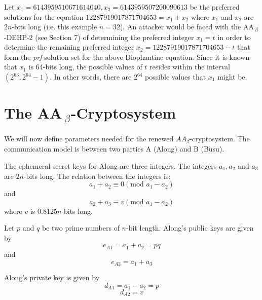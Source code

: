 \documentclass{llncs}
\begin{document}
\begin{example}
Let $x_{1}=6143959510671614040, x_{2}=6143959507200090613$ be the
preferred solutions for the equation
$12287919017871704653=x_{1}+x_{2}$ where $x_1$ and $x_{2}$ are
$2n$-bits long (i.e. this example $n=32$). An attacker would be
faced with the AA\,$_{\beta}$-DEHP-2 (see Section 7) of
determining the preferred integer $x_{1}=t$ in order to determine
the remaining preferred integer $x_{2}=12287919017871704653-t$
that form the \textit{prf}-solution set for the above Diophantine
equation. Since it is known that $x_{1}$ is 64-bits long, the
possible values of $t$ resides within the interval $(2^{63},
2^{64}-1)$. In other words, there are $2^{64}$ possible values
that $x_{1}$ might be.
\end{example}

\section{The AA\,$_{\beta}$-Cryptosystem}
\noindent We will now define parameters needed for the renewed
$AA_\beta$-cryptosystem. The communication model is between two
parties A (Along) and B (Busu).

\begin{definition}
The ephemeral secret keys for Along are three integers. The
integers $a_{1}, a_{2}$ and $a_{3}$ are $2n$-bits long. The
relation between the integers is:
\begin{equation}
a_{1}+a_{2}\equiv 0 (\textrm{mod }a_{1}-a_{2})
\end{equation}
and
\begin{equation}
a_{2}+a_{3}\equiv v (\textrm{mod }a_{1}-a_{2})
\end{equation}
where $v$ is $0.8125n$-bits long.
\end{definition}

\begin{definition}
Let $p$ and $q$ be two prime numbers of $n$-bit length. Along's
public keys are given by
\begin{equation}
e_{A1}=a_{1} + a_{2}=pq
\end{equation}
and
\begin{equation}
e_{A2}=a_{1} + a_{3}
\end{equation}
\end{definition}

\begin{definition}
Along's private key is given by
\begin{equation}
d_{A1}=a_{1}-a_{2}=p
\end{equation}
\begin{equation}
d_{A2}=v
\end{equation}
\end{definition}
\end{document}
